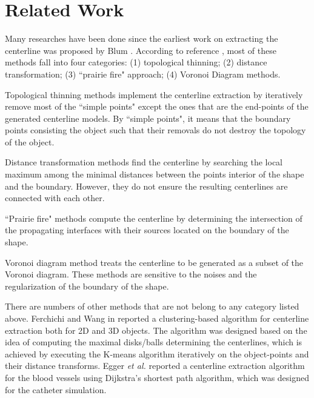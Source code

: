 
\section{Related Work}
\label{sec5_2}

Many researches have been done since the earliest work on extracting the centerline was proposed by Blum \cite{Blum1967}.
According to reference \cite{Ogniewicz1995}, most of these methods fall into four categories: (1) topological thinning; (2) distance transformation; (3) ``prairie fire" approach; (4) Voronoi Diagram methods. %

Topological thinning methods \cite{Ma2002,Sadleir2002} implement the centerline extraction by iteratively remove most of the ``simple points" except the ones that are the end-points of the generated centerline models. %
By ``simple points", it means that the boundary points consisting the object such that their removals do not destroy the topology of the object.

Distance transformation methods \cite{Niblack1992} find the centerline by searching the local maximum among the minimal distances between the points interior of the shape and the boundary. %
However, they do not ensure the resulting centerlines are connected with each other.

``Prairie fire" methods \cite{Blum1967,Leymarie1992} compute the centerline by determining the intersection of the propagating interfaces with their sources located on the boundary of the shape. %

Voronoi diagram method \cite{Sherbrooke1996,Antiga2003} treats the centerline to be generated as a subset of the Voronoi diagram.
These methods are sensitive to the noises and the regularization of the boundary of the shape.

There are numbers of other methods that are not belong to any category listed above.
Ferchichi and Wang in \cite{Ferchichi2006} reported a clustering-based algorithm for centerline extraction both for 2D and 3D objects.
The algorithm was designed based on the idea of computing the maximal disks/balls determining the centerlines, which is achieved by executing the K-means algorithm iteratively on the object-points and their distance transforms. %
Egger \textit{et al.} \cite{Egger2007} reported a centerline extraction algorithm for the blood vessels using Dijkstra's shortest path algorithm, which was designed for the catheter simulation. %
